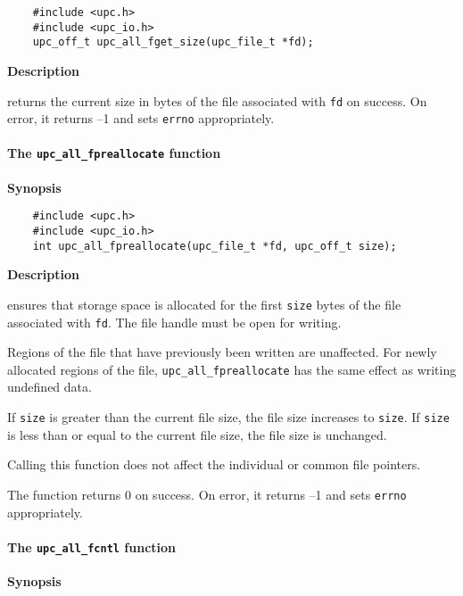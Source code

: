 \npf\vspace{-2.5em} 

\begin{verbatim}
    #include <upc.h>
    #include <upc_io.h>
    upc_off_t upc_all_fget_size(upc_file_t *fd);
\end{verbatim}

{\bf Description}

 returns the current size in bytes of the file
associated with {\tt fd} on success. On error, it returns --1 and sets {\tt errno}
appropriately.

\paragraph{The {\tt upc\_all\_fpreallocate} function}

{\bf Synopsis}

\npf\vspace{-2.5em}
 \begin{verbatim}
    #include <upc.h>
    #include <upc_io.h>
    int upc_all_fpreallocate(upc_file_t *fd, upc_off_t size);
\end{verbatim}

{\bf Description}

 ensures that storage space is allocated for the
first {\tt size} bytes of the file associated with {\tt fd}. The file handle must be open for
writing.

\np Regions of the file that have previously been written are unaffected. For
newly allocated regions of the file, {\tt upc\_all\_fpreallocate} has the
same effect as writing undefined data.

\np If {\tt size} is greater than the current file size, the file size increases to
{\tt size}. If {\tt size} is less than or equal to the current file size, the file size
is unchanged.

\np Calling this function does not affect the individual or common file pointers.

\np The function returns 0 on success. On error, it returns --1 and sets {\tt errno}
appropriately.

\paragraph{The {\tt upc\_all\_fcntl} function}

{\bf Synopsis}

